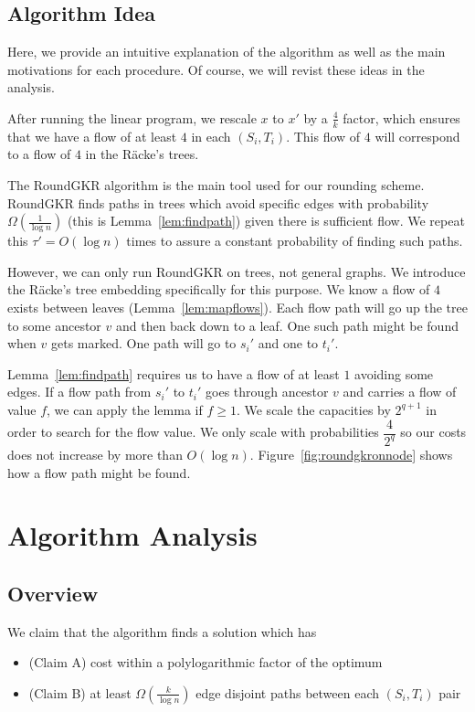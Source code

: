 \documentclass[12pt]{article}
\begin{document}
\subsection{Algorithm Idea}

Here, we provide an intuitive explanation of the algorithm as well as the main motivations for each procedure. Of course, we will revist these ideas in the analysis.

After running the linear program, we rescale $x$ to $x'$ by a $\frac{4}{k}$ factor, which ensures that we have a flow of at least $4$ in each $(S_i, T_i)$. This flow of $4$ will correspond to a flow of $4$ in the R\"{a}cke's trees.

The RoundGKR algorithm is the main tool used for our rounding scheme. RoundGKR finds paths in trees which avoid specific edges with probability $\Omega(\frac{1}{\log n})$ (this is Lemma~\ref{lem:findpath}) given there is sufficient flow. We repeat this $\tau' = O(\log n)$ times to assure a constant probability of finding such paths. 

However, we can only run RoundGKR on trees, not general graphs. We introduce the R\"{a}cke's tree embedding specifically for this purpose. We know a flow of $4$ exists between leaves (Lemma~\ref{lem:mapflows}). Each flow path will go up the tree to some ancestor $v$ and then back down to a leaf. One such path might be found when $v$ gets marked. One path will go to $s_i'$ and one to $t_i'$.

Lemma~\ref{lem:findpath} requires us to have a flow of at least $1$ avoiding some edges. If a flow path from $s_i'$ to $t_i'$ goes through ancestor $v$ and carries a flow of value $f$, we can apply the lemma if $f \geq 1$. We scale the capacities by $2^{q+1}$ in order to search for the flow value. We only scale with probabilities $\dfrac{4}{2^q}$ so our costs does not increase by more than $O(\log n)$. Figure~\ref{fig:roundgkronnode} shows how a flow path might be found.

\section{Algorithm Analysis}

\subsection{Overview}

We claim that the algorithm finds a solution which has
\begin{itemize}
\item (Claim A) cost within a polylogarithmic factor of the optimum
\item (Claim B) at least $\Omega(\frac{k}{\log n})$ edge disjoint paths between each $(S_i, T_i)$ pair
\end{itemize}
\end{document}

